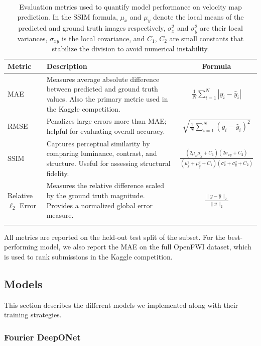 \documentclass{article}
\begin{document}
\begin{table}
    \centering
    \renewcommand{\arraystretch}{1.4}
    \begin{tabular}{@{}p{1cm} p{8cm} c@{}}
    \toprule
    \textbf{Metric} & \textbf{Description} & \textbf{Formula} \\
    \midrule
    MAE & Measures average absolute difference between predicted and ground truth values. Also the primary metric used in the Kaggle competition. & 
    $\displaystyle \frac{1}{N} \sum_{i=1}^{N} |y_i - \hat{y}_i|$ \\
    \addlinespace
    RMSE & Penalizes large errors more than MAE; helpful for evaluating overall accuracy. &
    $\displaystyle \sqrt{ \frac{1}{N} \sum_{i=1}^{N} (y_i - \hat{y}_i)^2 }$ \\
    \addlinespace
    SSIM & Captures perceptual similarity by comparing luminance, contrast, and structure. Useful for assessing structural fidelity. &
    $\displaystyle \frac{(2\mu_x \mu_y + C_1)(2\sigma_{xy} + C_2)}{(\mu_x^2 + \mu_y^2 + C_1)(\sigma_x^2 + \sigma_y^2 + C_2)}$ \\
    \addlinespace
    Relative $\ell_2$ Error & Measures the relative difference scaled by the ground truth magnitude. Provides a normalized global error measure. &
    $\displaystyle \frac{ \| y - \hat{y} \|_2 }{ \| y \|_2 }$ \\
    \bottomrule
    \vspace{0.1em}
    \end{tabular}
    \caption{Evaluation metrics used to quantify model performance on velocity map prediction. In the SSIM formula, $\mu_x$ and $\mu_y$ denote the local means of the predicted and ground truth images respectively, $\sigma_x^2$ and $\sigma_y^2$ are their local variances, $\sigma_{xy}$ is the local covariance, and $C_1$, $C_2$ are small constants that stabilize the division to avoid numerical instability.}
    \label{tab:metrics}
\end{table}

All metrics are reported on the held-out test split of the subset. For the best-performing model, we also report the MAE on the full OpenFWI dataset, which is used to rank submissions in the Kaggle competition.

\subsection{Models}
This section describes the different models we implemented along with their training strategies.
\subsubsection{Fourier DeepONet}
\end{document}
